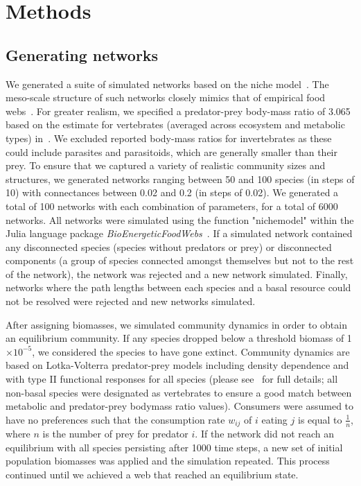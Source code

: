 \documentclass[12pt]{article}
\begin{document}
\section{Methods}

	\subsection*{Generating networks}

		We generated a suite of simulated networks based on the niche model~\citep{Williams2000}. The meso-scale structure of such networks closely mimics that of empirical food webs~\citep{Stouffer2007}. For greater realism, we specified a predator-prey body-mass ratio of 3.065 based on the estimate for vertebrates (averaged across ecosystem and metabolic types) in~\citet{Brose2006}. We excluded reported body-mass ratios for invertebrates as these could include parasites and parasitoids, which are generally smaller than their prey. To ensure that we captured a variety of realistic community sizes and structures, we generated networks ranging between 50 and 100 species (in steps of 10) with connectances between 0.02 and 0.2 (in steps of 0.02). We generated a total of 100 networks with each combination of parameters, for a total of 6000 networks. All networks were simulated using the function "nichemodel" within the Julia language package \emph{BioEnergeticFoodWebs}~\citep{bioenergeticfw,Delmas2017}. If a simulated network contained any disconnected species (species without predators or prey) or disconnected components (a group of species connected amongst themselves but not to the rest of the network), the network was rejected and a new network simulated. Finally, networks where the path lengths between each species and a basal resource could not be resolved were rejected and new networks simulated.


		After assigning biomasses, we simulated community dynamics  in order to obtain an equilibrium community. If any species dropped below a threshold biomass of 1$\times10^{-5}$, we considered the species to have gone extinct. Community dynamics are based on Lotka-Volterra predator-prey models including density dependence and with type II functional responses for all species (please see~\citet{Delmas2017} for full details; all non-basal species were designated as vertebrates to ensure a good match between metabolic and predator-prey bodymass ratio values). Consumers were assumed to have no preferences such that the consumption rate $w_{ij}$ of $i$ eating $j$ is equal to $\frac{1}{n}$, where $n$ is the number of prey for predator $i$. If the network did not reach an equilibrium with all species persisting after 1000 time steps, a new set of initial population biomasses was applied and the simulation repeated. This process continued until we achieved a web that reached an equilibrium state.
\end{document}
